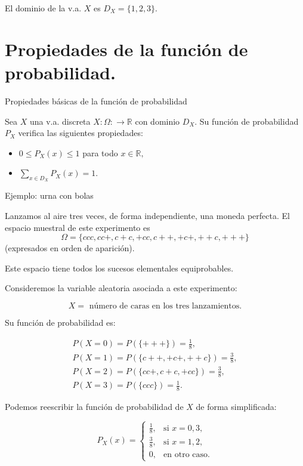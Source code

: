 \documentclass[
  letterpaper,
  DIV=11,
  numbers=noendperiod]{scrreprt}
\providecommand{\tightlist}{%
  \setlength{\itemsep}{0pt}\setlength{\parskip}{0pt}}\usepackage{longtable,booktabs,array}
\begin{document}
El dominio de la v.a. \(X\) es \(D_X=\{1,2,3\}.\)

\section{Propiedades de la función de
probabilidad.}\label{propiedades-de-la-funciuxf3n-de-probabilidad.}

Propiedades básicas de la función de probabilidad

Sea \(X\) una v.a. discreta \(X:\Omega:\to\mathbb{R}\) con dominio
\(D_X\). Su función de probabilidad \(P_{X}\) verifica las siguientes
propiedades:

\begin{itemize}
\tightlist
\item
  \(0\leq P_{X}(x)\leq 1\) para todo \(x\in\mathbb{R},\)
\item
  \(\sum\limits_{x\in D_X} P_{X}(x)=1.\)
\end{itemize}

Ejemplo: urna con bolas

Lanzamos al aire tres veces, de forma independiente, una moneda
perfecta. El espacio muestral de este experimento es
\[\Omega=\{ccc,cc+,c+c,+cc,c++,+c+,++c,+++\}\] (expresados en orden de
aparición).

Este espacio tiene todos los sucesos elementales equiprobables.

Consideremos la variable aleatoria asociada a este experimento:

\[X=\mbox{ número de caras en los tres lanzamientos}.\]

Su función de probabilidad es:

\[
\begin{array}{l}
P(X=0)=P(\{+++\})=\frac18,\\ P(X=1)=P(\{c++,+c+,++c\})=\frac38,\\
    P(X=2)=P(\{cc+,c+c,+cc\})=\frac38,\\
    P(X=3)=P(\{ccc\})=\frac18.
\end{array}
\]

Podemos reescribir la función de probabilidad de \(X\) de forma
simplificada:

\[P_{X}(x)=\left\{\begin{array}{ll} \frac18, & \mbox{si } x=0, 3,\\[0.5ex]
\frac38, & \mbox{si } x=1,2,\\ 0, & \mbox{en otro caso}.\end{array}\right.\]
\end{document}
